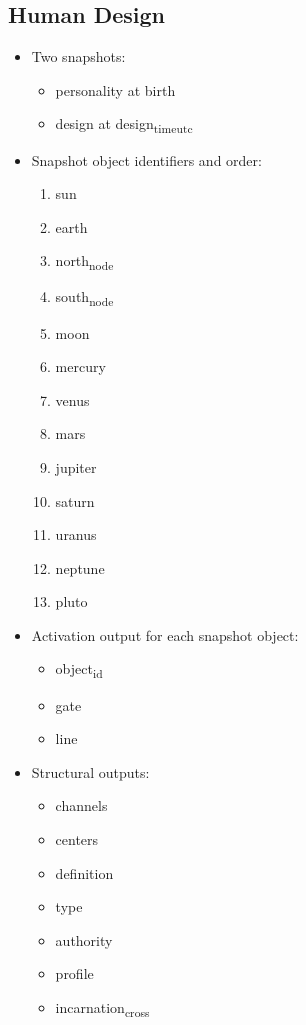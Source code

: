 \documentclass[11pt]{article}
\begin{document}
\subsection{Human Design}
\label{sec:org622c0ea}
\begin{itemize}
\item Two snapshots:
\begin{itemize}
\item personality at birth
\item design at design\textsubscript{time}\textsubscript{utc}
\end{itemize}
\item Snapshot object identifiers and order:
\begin{enumerate}
\item sun
\item earth
\item north\textsubscript{node}
\item south\textsubscript{node}
\item moon
\item mercury
\item venus
\item mars
\item jupiter
\item saturn
\item uranus
\item neptune
\item pluto
\end{enumerate}
\item Activation output for each snapshot object:
\begin{itemize}
\item object\textsubscript{id}
\item gate
\item line
\end{itemize}
\item Structural outputs:
\begin{itemize}
\item channels
\item centers
\item definition
\item type
\item authority
\item profile
\item incarnation\textsubscript{cross}
\end{itemize}
\end{itemize}
\end{document}
